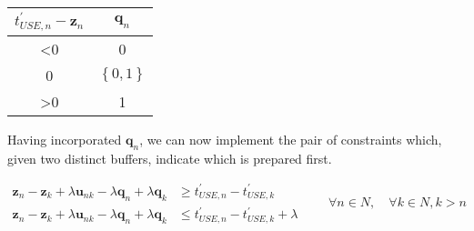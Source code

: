 \begin{center}
    \begin{tabular}{c | c}
        $t_{USE,n}^{\prime} - \boldsymbol{z}_{n}$ 
        & $\boldsymbol{q}_{n}$\\ \hline
        <0 & 0\\
        0 & $\left\{ 0, 1 \right\}$\\
        >0 & 1\\
    \end{tabular}
\end{center}

Having incorporated $ \boldsymbol{q}_{n} $, we can now implement the pair of 
constraints which, given two distinct buffers, indicate which is prepared
first.

\begin{equation}
    \begin{split}
        \boldsymbol{z}_{n} - \boldsymbol{z}_{k} + \lambda \boldsymbol{u}_{nk}
        - \lambda \boldsymbol{q}_{n} + \lambda \boldsymbol{q}_{k} &\ge 
        t_{USE,n}^{\prime} - t_{USE,k}^{\prime}\\
        \boldsymbol{z}_{n} - \boldsymbol{z}_{k} + \lambda \boldsymbol{u}_{nk}
        - \lambda \boldsymbol{q}_{n} + \lambda \boldsymbol{q}_{k} &\le 
        t_{USE,n}^{\prime} - t_{USE,k}^{\prime} + \lambda
    \end{split}
    \quad \quad \forall n \in N, \quad \forall k \in N, k > n
\end{equation}


